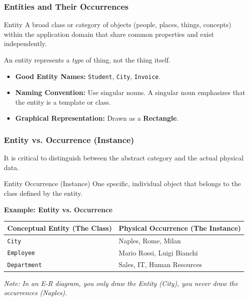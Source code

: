 \subsubsection{Entities and Their Occurrences}

\begin{defbox}{Entity}
A broad class or category of objects (people, places, things, concepts) within the application domain that share common properties and exist independently.
\end{defbox}

An entity represents a \textit{type} of thing, not the thing itself.
\begin{itemize}
    \item \textbf{Good Entity Names:} \texttt{Student}, \texttt{City}, \texttt{Invoice}.
    \item \textbf{Naming Convention:} Use singular nouns. A singular noun emphasizes that the entity is a template or class.
    \item \textbf{Graphical Representation:} Drawn as a \textbf{Rectangle}.
\end{itemize}

\begin{center}
\end{center}


\subsubsection{Entity vs. Occurrence (Instance)}
It is critical to distinguish between the abstract category and the actual physical data.

\begin{defbox}{Entity Occurrence (Instance)}
One specific, individual object that belongs to the class defined by the entity. 
\end{defbox}

\vspace{0.2cm}
\begin{example}{\textbf{Example: Entity vs. Occurrence}}


\vspace{0.2cm}
\begin{center}
\begin{tabular}{|l|l|}
\hline
\textbf{Conceptual Entity (The Class)} & \textbf{Physical Occurrence (The Instance)} \\
\hline
\texttt{City} & Naples, Rome, Milan \\
\texttt{Employee} & Mario Rossi, Luigi Bianchi \\
\texttt{Department} & Sales, IT, Human Resources \\
\hline
\end{tabular}
\end{center}
\textit{Note: In an E-R diagram, you only draw the Entity (City), you never draw the occurrences (Naples).}
\end{example}

